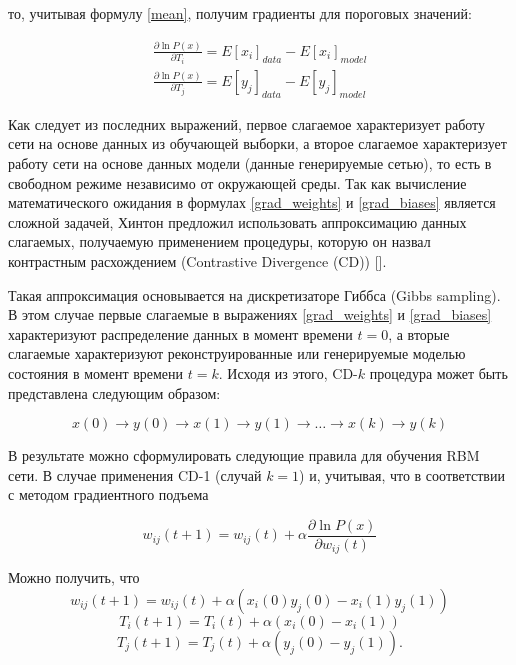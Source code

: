 то, учитывая формулу \ref{mean}, получим градиенты для пороговых значений:

\begin{equation}
	\label{grad_biases}
	\begin{aligned}
		\frac{\partial \ln P(x)}{\partial T_i}=E\left[x_i\right]_{data}-E\left[x_i\right]_{model}\\
		\frac{\partial \ln P(x)}{\partial T_j}=E\left[y_j\right]_{data}-E\left[y_j\right]_{model}
	\end{aligned}
\end{equation}

Как следует из последних выражений, первое слагаемое характеризует работу сети на основе данных из обучающей выборки, а  второе слагаемое характеризует работу сети на основе данных модели (данные генерируемые сетью), то есть в свободном режиме независимо от окружающей среды.
Так как вычисление математического ожидания в формулах \ref{grad_weights} и \ref{grad_biases} является сложной задачей, Хинтон предложил использовать аппроксимацию данных слагаемых, получаемую применением процедуры, которую он назвал контрастным расхождением (Contrastive Divergence (CD)) [].

Такая аппроксимация основывается на дискретизаторе Гиббса (Gibbs sampling). В этом случае первые слагаемые в выражениях \ref{grad_weights} и \ref{grad_biases} характеризуют распределение данных в момент времени $t=0$, а вторые слагаемые характеризуют реконструированные или генерируемые моделью состояния в момент времени $t=k$. Исходя из этого, CD-$k$ процедура может быть представлена следующим образом:

\begin{equation}
	x(0) \rightarrow y(0) \rightarrow x(1) \rightarrow y(1) \rightarrow \ldots \rightarrow x(k) \rightarrow y(k)
\end{equation}

В результате можно сформулировать следующие правила для обучения RBM сети. В случае применения CD-1 (случай $k=1$) и, учитывая, что в соответствии с методом градиентного подъема

\begin{equation*}
	w_{ij}(t+1)=w_{ij}(t)+\alpha\frac{\partial \ln P(x)}{\partial w_{ij}(t)}
\end{equation*}	 

Можно получить, что
\begin{equation*}
	w_{ij}(t+1)=w_{ij}(t)+\alpha(x_i(0)y_j(0)-x_i(1)y_j(1))
\end{equation*}
\begin{equation*}		
	T_i(t+1)=T_i(t)+\alpha(x_i(0)-x_i(1))
\end{equation*}
\begin{equation*}		
	T_j(t+1)=T_j(t)+\alpha(y_j(0)-y_j(1)).
\end{equation*}		


